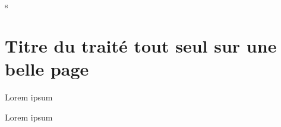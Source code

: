 \documentclass{book}
\begin{document}
\frontmatter
s
\mainmatter
\begingroup

\makeatletter
\patchcmd{\@endpart}{\null}{}{}{}
\makeatother
\part*{Titre du traité tout seul sur une belle page}
\endgroup

\begin{pages}
  \begin{Leftside}
    \beginnumbering
    \pstart
    Lorem ipsum
    \pend
    \endnumbering
  \end{Leftside}
  \begin{Rightside}
    \beginnumbering
    \pstart
    Lorem ipsum
    \pend
    \endnumbering
  \end{Rightside}
\end{pages}
\Pages
\end{document}
